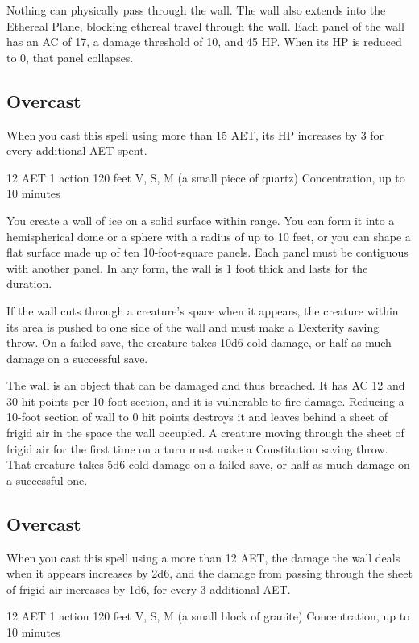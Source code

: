 Nothing can physically pass through the wall. The wall also extends into the Ethereal Plane, blocking ethereal travel through the wall. Each panel of the wall has an AC of 17, a damage threshold of 10, and 45 HP. When its HP is reduced to 0, that panel collapses.

\subsection*{Overcast} When you cast this spell using more than 15 AET, its HP increases by 3 for every additional AET spent.

{12 AET}
{1 action}
{120 feet}
{V, S, M (a small piece of quartz)}
{Concentration, up to 10 minutes}

You create a wall of ice on a solid surface within range. You can form it into a hemispherical dome or a sphere with a radius of up to 10 feet, or you can shape a flat surface made up of ten 10-foot-square panels. Each panel must be contiguous with another panel. In any form, the wall is 1 foot thick and lasts for the duration.

If the wall cuts through a creature's space when it appears, the creature within its area is pushed to one side of the wall and must make a Dexterity saving throw. On a failed save, the creature takes 10d6 cold damage, or half as much damage on a successful save.

The wall is an object that can be damaged and thus breached. It has AC 12 and 30 hit points per 10-foot section, and it is vulnerable to fire damage. Reducing a 10-foot section of wall to 0 hit points destroys it and leaves behind a sheet of frigid air in the space the wall occupied. A creature moving through the sheet of frigid air for the first time on a turn must make a Constitution saving throw. That creature takes 5d6 cold damage on a failed save, or half as much damage on a successful one.

\subsection*{Overcast} When you cast this spell using a more than 12 AET, the damage the wall deals when it appears increases by 2d6, and the damage from passing through the sheet of frigid air increases by 1d6, for every 3 additional AET.

{12 AET}
{1 action}
{120 feet}
{V, S, M (a small block of granite)}
{Concentration, up to 10 minutes}

